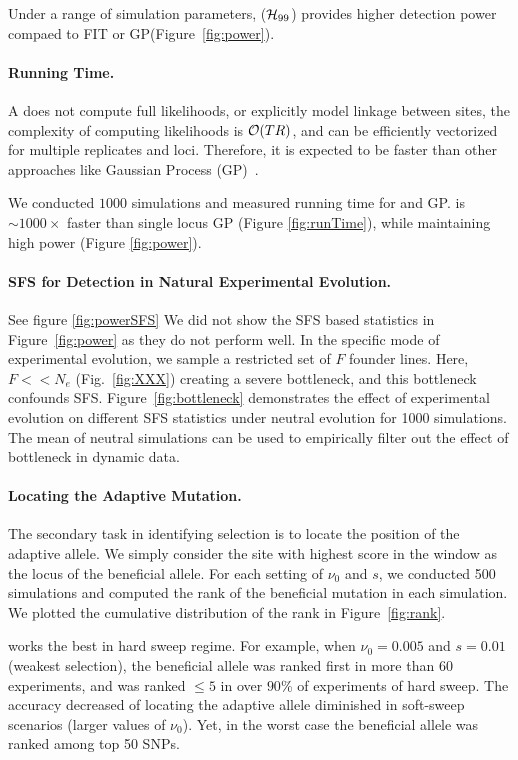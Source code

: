 \documentclass[11pt]{article}
\def\comale{\text{COMALE }}
\begin{document}
Under a range of simulation parameters, \comale(${\cal H}_{99}$)
provides higher detection power compaed to FIT or
GP(Figure~\ref{fig:power}).

\paragraph{Running Time.}
A \comale does not compute full likelihoods, or explicitly model
linkage between sites, the complexity of computing likelihoods is
${\cal O}(TR)$, and can be efficiently vectorized for multiple replicates
and loci. Therefore, it is expected to be faster than other approaches
like Gaussian Process (GP)~\cite{Terhorst2015Multi}.

We conducted $1000$ simulations and measured running time for \comale
and GP. \comale is $\sim 1000\times$ faster than single locus GP
(Figure \ref{fig:runTime}), while maintaining high power (Figure
\ref{fig:power}).


\paragraph{SFS for Detection in Natural Experimental Evolution.} See
figure \ref{fig:powerSFS} We did not show the SFS based statistics in
Figure~\ref{fig:power} as they do not perform well. In the specific
mode of experimental evolution, we sample a restricted set of $F$
founder lines. Here, $F<<N_e$ (Fig.~\ref{fig:XXX}) creating a severe
bottleneck, and this bottleneck confounds
SFS. Figure~\ref{fig:bottleneck} demonstrates the effect of
experimental evolution on different SFS statistics under neutral
evolution for 1000 simulations. The mean of neutral simulations can be
used to empirically filter out the effect of bottleneck in dynamic
data.


\paragraph{Locating the Adaptive Mutation.}
The secondary task in identifying selection is to locate the position
of the adaptive allele. We simply consider the site with highest score
in the window as the locus of the beneficial allele. For each setting
of $\nu_0$ and $s$, we conducted 500 simulations
and computed the rank of the beneficial mutation in each
simulation. We plotted the cumulative distribution of the rank in
Figure~\ref{fig:rank}.

\comale works the best in hard sweep regime. For example, when
$\nu_0=0.005$ and $s=0.01$ (weakest selection), the beneficial allele
was ranked first in more than 60 experiments, and was ranked $\le 5$
in over $90$\% of experiments of hard sweep. The accuracy decreased of
locating the adaptive allele diminished in soft-sweep scenarios
(larger values of $\nu_0$). Yet, in the worst case the beneficial
allele was ranked among top 50 SNPs.
\end{document}
